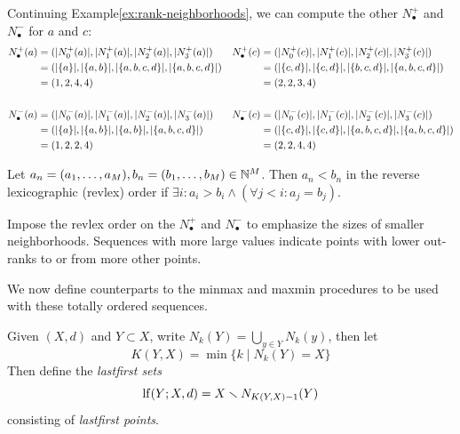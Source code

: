 \documentclass[
]{article}
\begin{document}
\begin{example}\label{ex:rank-sequence}
Continuing Example\nbs\ref{ex:rank-neighborhoods}, we can compute the other $N_\bullet^+$ and $N_\bullet^-$ for $a$ and $c$:
\begin{align*}
    N_\bullet^+ (a) &= (\lvert N^+_0(a)\rvert, \lvert N^+_1(a)\rvert, \lvert N^+_2(a)\rvert, \lvert N^+_3(a)\rvert) &
    N_\bullet^+ (c) &= (\lvert N^+_0(c)\rvert, \lvert N^+_1(c)\rvert, \lvert N^+_2(c)\rvert, \lvert N^+_3(c)\rvert) \\
    &= (\lvert \{a\}\rvert, \lvert \{a, b\}\rvert, \lvert \{a, b, c, d\}\rvert, \lvert \{a, b, c, d\}\rvert) &
    &= (\lvert \{c, d\}\rvert, \lvert \{c, d\}\rvert, \lvert \{b, c, d\}\rvert, \lvert \{a, b, c, d\}\rvert) \\
    &= (1, 2, 4, 4) &
    &= (2, 2, 3, 4) \\
    \\
    N_\bullet^- (a) &= (\lvert N^-_0(a)\rvert, \lvert N^-_1(a)\rvert, \lvert N^-_2(a)\rvert, \lvert N^-_3(a)\rvert) &
    N_\bullet^- (c) &= (\lvert N^-_0(c)\rvert, \lvert N^-_1(c)\rvert, \lvert N^-_2(c)\rvert, \lvert N^-_3(c)\rvert) \\
    &= (\lvert \{a\}\rvert, \lvert \{a, b\}\rvert, \lvert \{a, b\}\rvert, \lvert \{a, b, c, d\}\rvert) &
    &= (\lvert \{c, d\}\rvert, \lvert \{c, d\}\rvert, \lvert \{a, b, c, d\}\rvert, \lvert \{a, b, c, d\}\rvert) \\
    &= (1, 2, 2, 4) &
    &= (2, 2, 4, 4)
\end{align*}
\end{example}

\begin{definition}
    Let $a_n = (a_1,\ldots,a_M),b_n = (b_1,\ldots,b_M)\in\mathbb{N}^M$.
    Then $a_n < b_n$ in the reverse lexicographic (revlex) order if $\exists i : a_i > b_i \wedge (\forall j<i : a_j = b_j)$.
\end{definition}

Impose the revlex order on the \(N_\bullet^+\) and \(N_\bullet^-\) to
emphasize the sizes of smaller neighborhoods. Sequences with more large
values indicate points with lower out-ranks to or from more other
points.

We now define counterparts to the minmax and maxmin procedures to be
used with these totally ordered sequences.

\begin{definition}
    Given $(X,d)$ and $Y \subset X$, write $N_k(Y) = \bigcup_{y \in Y}{N_k(y)}$, then let
    $$K(Y,X) = \min\{ k \mid N_k(Y) = X \}$$
    Then define the \emph{lastfirst sets}
    $$\operatorname{lf}(Y;X,d) = X \smallsetminus N_{K(Y,X) - 1}(Y)$$
    consisting of \emph{lastfirst points}.
\end{definition}
\end{document}
